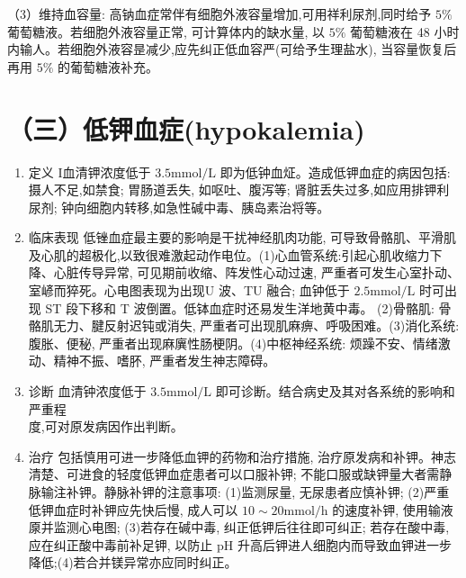 \documentclass[10pt]{article}
\begin{document}
（3）维持血容量: 高钠血症常伴有细胞外液容量增加,可用祥利尿剂,同时给予 $5 \%$ 葡萄糖液。若细胞外液容量正常, 可计算体内的缺水量, 以 $5 \%$ 葡萄糖液在 48 小时内输人。若细胞外液容昰减少,应先纠正低血容严(可给予生理盐水), 当容量恢复后再用 $5 \%$ 的葡萄糖液补充。

\section*{（三）低钾血症(hypokalemia)}
\begin{enumerate}
  \item 定义 I血清钾浓度低于 $3.5 \mathrm{mmol} / \mathrm{L}$ 即为低钟血炡。造成低钾血症的病因包括:摄人不足,如禁食; 胃肠道丢失, 如呕吐、腹泻等; 肾脏丢失过多,如应用排钾利尿剂; 钟向细胞内转移,如急性碱中毒、胰岛素治将等。

  \item 临床表现 低锉血症最主要的影响是干扰神经肌肉功能, 可导致骨骼肌、平滑肌及心肌的超极化,以致很难激起动作电位。(1)心血管系统:引起心肌收缩力下降、心脏传导异常, 可见期前收缩、阵发性心动过速, 严重者可发生心室扑动、室嵃而猝死。心电图表现为出现U 波、TU 融合; 血钟低于 $2.5 \mathrm{mmol} / \mathrm{L}$ 时可出现 ST 段下移和 T 波倒置。低钵血症时还易发生洋地黄中毒。 (2)骨骼肌: 骨骼肌无力、腱反射迟钝或消失, 严重者可出现肌麻痹、呼吸困难。(3)消化系统: 腹胀、便秘, 严重者出现麻廙性肠梗阴。(4)中枢神经系统: 烦躁不安、情绪激动、精神不振、嗜肧, 严重者发生神志障碍。

  \item 诊断 血清钟浓度低于 $3.5 \mathrm{mmol} / \mathrm{L}$ 即可诊断。结合病史及其对各系统的影响和严重程\\
度,可对原发病因作出判断。

  \item 治疗 包括慎用可进一步降低血钾的药物和治疗措施, 治疗原发病和补钾。神志清楚、可进食的轻度低钾血症患者可以口服补钾; 不能口服或缺钾量大者需静脉输注补钾。静脉补钾的注意事项: (1)监测尿量, 无尿患者应慎补钾; (2)严重低钾血症时补钾应先快后慢, 成人可以 $10 \sim 20 \mathrm{mmol} / \mathrm{h}$ 的速度补钾, 使用输液厡并监测心电图; (3)若存在碱中毒, 纠正低钾后往往即可纠正; 若存在酸中毒, 应在纠正酸中毒前补足钾, 以防止 $\mathrm{pH}$ 升高后钾进人细胞内而导致血钾进一步降低;(4)若合并镁异常亦应同时纠正。

\end{enumerate}
\end{document}
